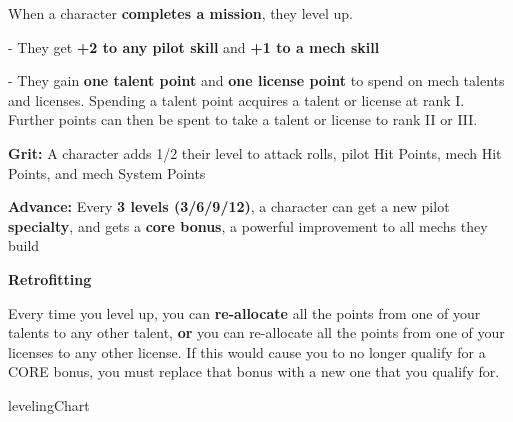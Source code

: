 When a character \textbf{completes a mission}, they level up.

             -   They get \textbf{+2 to any pilot skill} and \textbf{+1 to a mech skill} 

             -   They gain \textbf{one talent point} and \textbf{one license point} to spend on mech talents and
                 licenses. Spending a talent point acquires a talent or license at rank I. Further
                 points can then be spent to take a talent or license to rank II or III.





\textbf{Grit:} A character adds 1/2 their level to attack rolls, pilot Hit Points, mech Hit Points, and mech
System Points

\textbf{Advance:} Every \textbf{3 levels (3/6/9/12)}, a character can get a new
pilot \textbf{specialty}, and gets a \textbf{core bonus}, a powerful improvement to all mechs they build


                                             \textbf{Retrofitting} 

Every time you level up, you can \textbf{re-allocate} all the points from one of your talents to any other
talent, \textbf{or} you can re-allocate all the points from one of your licenses to any other license. If this
would cause you to no longer qualify for a CORE bonus, you must replace that bonus with a new
one that you qualify for.

{levelingChart}
